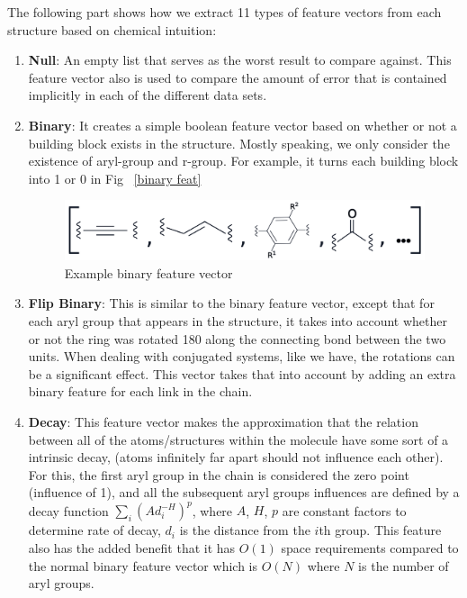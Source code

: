 \documentclass[12pt, oneside]{article}   	%
\begin{document}
The following part shows how we extract 11 types of feature vectors from each structure based on chemical intuition:

\begin{enumerate}
\item \textbf{Null}: An empty list that serves as the worst result to compare against. This feature vector also is used to compare the amount of error that is contained implicitly in each of the different data sets.

\item \textbf{Binary}: It creates a simple boolean feature vector based on whether or not a building block exists in the structure. Mostly speaking, we only consider the existence of aryl-group and r-group. For example, it turns each building block into 1 or 0 in Fig ~\ref{binary feat}

\begin{figure}[hb]
\begin{center}
\includegraphics [width=1\textwidth]{binaryfeat.png}
\caption{Example binary feature vector}\label{binaryfeat}
\end{center}
\end{figure}

\item \textbf{Flip Binary}: This is similar to the binary feature vector, except that for each aryl group that appears in the structure, it takes into account whether or not the ring was rotated 180 along the connecting bond between the two units. When dealing with conjugated systems, like we have, the rotations can be a significant effect. This vector takes that into account by adding an extra binary feature for each link in the chain.

\item \textbf{Decay}: This feature vector makes the approximation that the relation between all of the atoms/structures within the molecule have some sort of a intrinsic decay, (atoms infinitely far apart should not influence each other). For this, the first aryl group in the chain is considered the zero point (influence of 1), and all the subsequent aryl groups influences are defined by a decay function $\sum_{i} (Ad_{i}^{-H})^{p}$, where $A$, $H$, $p$ are constant factors to determine rate of decay, $d_{i}$ is the distance from the $i$th group. This feature also has the added benefit that it has $O(1)$ space requirements compared to the normal binary feature vector which is $O(N)$ where $N$ is the number of aryl groups.


\end{enumerate}
\end{document}
